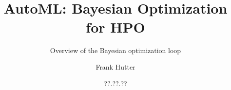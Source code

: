 %  


%

\usepackage[export]{adjustbox}
\usepackage{pgfpages}

\title[AutoML: Bayesian Optimization for HPO]{AutoML: Bayesian Optimization for HPO}
\subtitle{Overview of the Bayesian optimization loop}
\author[Frank Hutter]{Frank Hutter}
\date{??.??.??}




	
	\maketitle
	
%    
%    
    
    
%    


